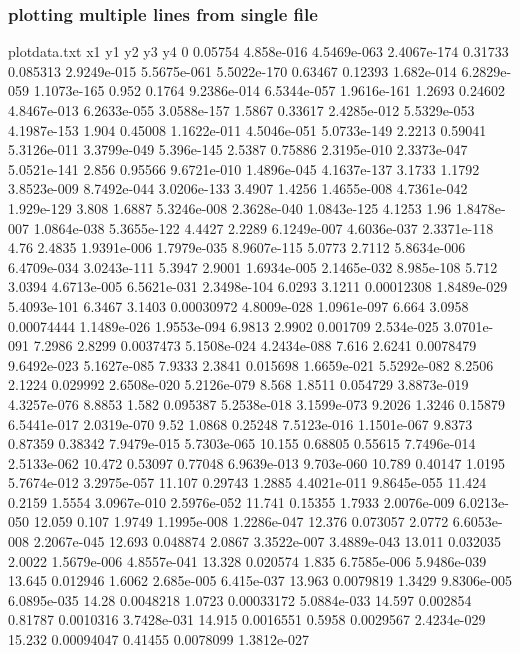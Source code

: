\subsubsection{plotting multiple lines from single file}
\begin{filecontents*}{plotdata.txt}
x1	y1	y2	y3	y4
0	0.05754	4.858e-016	4.5469e-063	2.4067e-174
0.31733	0.085313	2.9249e-015	5.5675e-061	5.5022e-170
0.63467	0.12393	1.682e-014	6.2829e-059	1.1073e-165
0.952	0.1764	9.2386e-014	6.5344e-057	1.9616e-161
1.2693	0.24602	4.8467e-013	6.2633e-055	3.0588e-157
1.5867	0.33617	2.4285e-012	5.5329e-053	4.1987e-153
1.904	0.45008	1.1622e-011	4.5046e-051	5.0733e-149
2.2213	0.59041	5.3126e-011	3.3799e-049	5.396e-145
2.5387	0.75886	2.3195e-010	2.3373e-047	5.0521e-141
2.856	0.95566	9.6721e-010	1.4896e-045	4.1637e-137
3.1733	1.1792	3.8523e-009	8.7492e-044	3.0206e-133
3.4907	1.4256	1.4655e-008	4.7361e-042	1.929e-129
3.808	1.6887	5.3246e-008	2.3628e-040	1.0843e-125
4.1253	1.96	1.8478e-007	1.0864e-038	5.3655e-122
4.4427	2.2289	6.1249e-007	4.6036e-037	2.3371e-118
4.76	2.4835	1.9391e-006	1.7979e-035	8.9607e-115
5.0773	2.7112	5.8634e-006	6.4709e-034	3.0243e-111
5.3947	2.9001	1.6934e-005	2.1465e-032	8.985e-108
5.712	3.0394	4.6713e-005	6.5621e-031	2.3498e-104
6.0293	3.1211	0.00012308	1.8489e-029	5.4093e-101
6.3467	3.1403	0.00030972	4.8009e-028	1.0961e-097
6.664	3.0958	0.00074444	1.1489e-026	1.9553e-094
6.9813	2.9902	0.001709	2.534e-025	3.0701e-091
7.2986	2.8299	0.0037473	5.1508e-024	4.2434e-088
7.616	2.6241	0.0078479	9.6492e-023	5.1627e-085
7.9333	2.3841	0.015698	1.6659e-021	5.5292e-082
8.2506	2.1224	0.029992	2.6508e-020	5.2126e-079
8.568	1.8511	0.054729	3.8873e-019	4.3257e-076
8.8853	1.582	0.095387	5.2538e-018	3.1599e-073
9.2026	1.3246	0.15879	6.5441e-017	2.0319e-070
9.52	1.0868	0.25248	7.5123e-016	1.1501e-067
9.8373	0.87359	0.38342	7.9479e-015	5.7303e-065
10.155	0.68805	0.55615	7.7496e-014	2.5133e-062
10.472	0.53097	0.77048	6.9639e-013	9.703e-060
10.789	0.40147	1.0195	5.7674e-012	3.2975e-057
11.107	0.29743	1.2885	4.4021e-011	9.8645e-055
11.424	0.2159	1.5554	3.0967e-010	2.5976e-052
11.741	0.15355	1.7933	2.0076e-009	6.0213e-050
12.059	0.107	1.9749	1.1995e-008	1.2286e-047
12.376	0.073057	2.0772	6.6053e-008	2.2067e-045
12.693	0.048874	2.0867	3.3522e-007	3.4889e-043
13.011	0.032035	2.0022	1.5679e-006	4.8557e-041
13.328	0.020574	1.835	6.7585e-006	5.9486e-039
13.645	0.012946	1.6062	2.685e-005	6.415e-037
13.963	0.0079819	1.3429	9.8306e-005	6.0895e-035
14.28	0.0048218	1.0723	0.00033172	5.0884e-033
14.597	0.002854	0.81787	0.0010316	3.7428e-031
14.915	0.0016551	0.5958	0.0029567	2.4234e-029
15.232	0.00094047	0.41455	0.0078099	1.3812e-027

\end{filecontents*}
